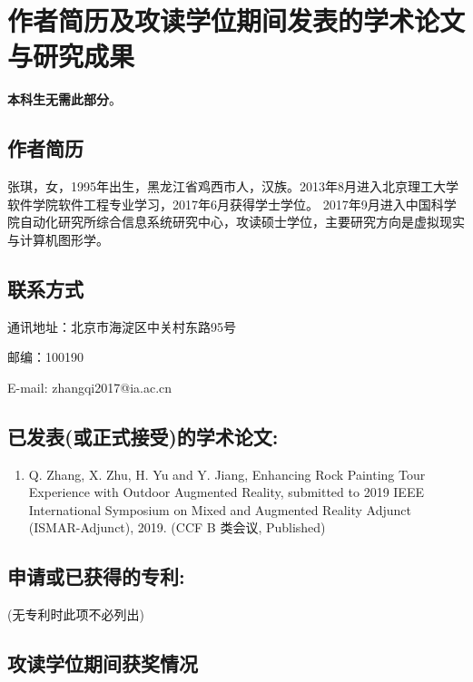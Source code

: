 \chapter{作者简历及攻读学位期间发表的学术论文与研究成果}

\textbf{本科生无需此部分}。

\section*{作者简历}


张琪，女，1995年出生，黑龙江省鸡西市人，汉族。2013年8月进入北京理工大学软件学院软件工程专业学习，2017年6月获得学士学位。
2017年9月进入中国科学院⾃动化研究所综合信息系统研究中⼼，攻读硕⼠学位，主要研究⽅向是虚拟现实与计算机图形学。

\section{联系方式}
通讯地址：北京市海淀区中关村东路95号

邮编：100190

E-mail: zhangqi2017@ia.ac.cn

\section*{已发表(或正式接受)的学术论文:}

{
\setlist[enumerate]{}%
\begin{enumerate}[nosep]
    \item Q. Zhang, X. Zhu, H. Yu and Y. Jiang, 
    Enhancing Rock Painting Tour Experience with Outdoor Augmented Reality, 
    submitted to 2019 IEEE International Symposium on Mixed and Augmented Reality Adjunct (ISMAR-Adjunct), 2019.
    (CCF B 类会议, Published)
\end{enumerate}
}

\section*{申请或已获得的专利:}

(无专利时此项不必列出)

\section*{攻读学位期间获奖情况}

